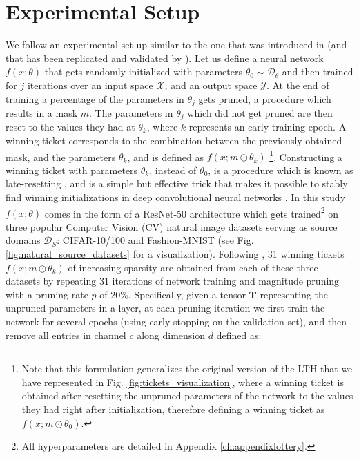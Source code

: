 \section{Experimental Setup}
\label{sec:experimental_setup}
We follow an experimental set-up similar to the one that was introduced in \cite{morcos2019one} (and that has been replicated and validated by \citet{gohil2019one}). Let us define a neural network $f(x;\theta)$ that gets randomly initialized with parameters $\theta_0 \sim \mathscr{D}_{\theta}$ and then trained for $j$ iterations over an input space $\mathcal{X}$, and an output space $\mathcal{Y}$. At the end of training a percentage of the parameters in $\theta_j$ gets pruned, a procedure which results in a mask $m$. The parameters in $\theta_j$ which did not get pruned are then reset to the values they had at $\theta_k$, where $k$ represents an early training epoch. A winning ticket corresponds to the combination between the previously obtained mask, and the parameters $\theta_k$, and is defined as $f(x;m\odot\theta_k)$ \footnote{Note that this formulation generalizes the original version of the LTH \cite{frankle2018lottery} that we have represented in Fig. \ref{fig:tickets_visualization}, where a winning ticket is obtained after resetting the unpruned parameters of the network to the values they had right after initialization, therefore defining a winning ticket as $f(x;m\odot\theta_0)$.}. Constructing a winning ticket with parameters $\theta_k$, instead of $\theta_0$, is a procedure which is known as late-resetting \cite{franklestabilizing}, and is a simple but effective trick that makes it possible to stably find winning initializations in deep convolutional neural networks \cite{franklestabilizing,morcos2019one}. In this study $f(x;\theta)$ comes in the form of a ResNet-50 architecture \cite{han2015deep} which gets trained\footnote{All hyperparameters are detailed in Appendix \ref{ch:appendixlottery}.} on three popular Computer Vision (CV) natural image datasets serving as source domains $\mathcal{D}_S$: CIFAR-10/100 and Fashion-MNIST (see Fig. \ref{fig:natural_source_datasets} for a visualization). Following \cite{han2015deep,morcos2019one}, 31 winning tickets $f(x;m\odot\theta_k)$ of increasing sparsity are obtained from each of these three datasets by repeating 31 iterations of network training and magnitude pruning with a pruning rate $p$ of 20\%. Specifically, given a tensor $\mathbf{T}$ representing the unpruned parameters in a layer, at each pruning iteration we first train the network for several epochs (using early stopping on the validation set), and then remove all entries in channel $c$ along dimension $d$ defined as:
